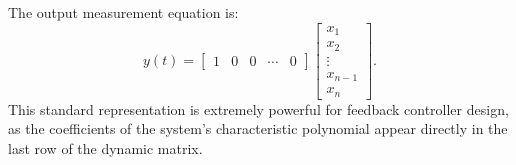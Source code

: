 The output measurement equation is:
\begin{equation}
y(t) = \begin{bmatrix} 1 & 0 & 0 & \cdots & 0 \end{bmatrix} \begin{bmatrix} x_1 \\ x_2 \\ \vdots \\ x_{n-1} \\ x_n \end{bmatrix} .
\end{equation}
This standard representation is extremely powerful for feedback controller design, as the coefficients of the system's characteristic polynomial appear directly in the last row of the dynamic matrix.
